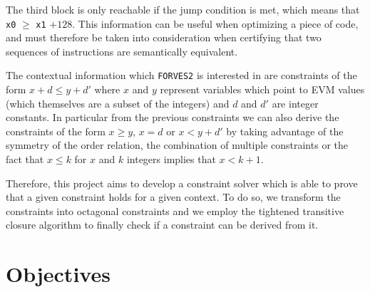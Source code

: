 \begin{center}
\end{center}

The third block is only reachable if the jump condition is met, which means that \verb|x0| $\ge$ 
\verb|x1| $+ 128$. This information can be useful when optimizing a piece of code, and must therefore
be taken into consideration when certifying that two sequences of instructions are semantically 
equivalent. 

The contextual information which \verb|FORVES2| is interested in are constraints of the form 
$x + d \le y + d'$ where $x$ and $y$ represent variables which point to EVM values (which themselves
are a subset of the integers) and $d$ and $d'$ are integer constants. In particular from the previous
constraints we can also derive the constraints of the form $x \ge y$, $x = d$ or $x < y + d'$ by taking
advantage of the symmetry of the order relation, the combination of multiple constraints or the fact
that $x \le k$ for $x$ and $k$ integers implies that $x < k + 1$. 



Therefore, this project aims to develop a constraint solver which is able to prove that a given
constraint holds for a given context. To do so, we transform the constraints into octagonal constraints
and we employ the tightened transitive closure algorithm to finally check if a constraint can be derived
from it.

\section{Objectives}
\label{sect:objectives}

